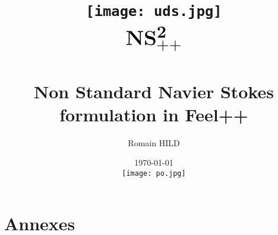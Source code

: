 \documentclass[a4paper,11pt]{report}
\title{\texttt{[image: uds.jpg]}\\$$ \mbox{\Huge
    $\mbf{NS_{++}^2}$}$$\\Non Standard Navier
  Stokes formulation in Feel++}
\author{Romain HILD}
\date{\today\\ \texttt{[image: po.jpg]}}
\begin{document}
\maketitle



\tableofcontents

















\part{Annexes}

\appendix
\makeatletter
\def\@seccntformat#1{Annexe~\csname the#1\endcsname:\quad}
\makeatother











\end{document}
